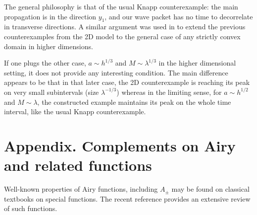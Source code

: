 \begin{rmq}
The general philosophy is that of the usual Knapp counterexample: the main propagation is in the direction $y_{1}$, and our wave packet has no time to decorrelate in transverse directions. A similar argument was used in \cite{doi2} to extend the previous counterexamples from the 2D model to the general case of any strictly convex domain in higher dimensions.
\end{rmq}
\begin{rmq}
If one plugs the other case, $a\sim h^{1/3}$ and $M\sim \lambda^{1/3}$ in the higher dimensional setting, it does not provide any interesting condition. The main difference appears to be that in that later case, the 2D counterexample is reaching its peak on very small subintervals (size $\lambda^{-1/3}$) whereas in the limiting sense, for $a\sim h^{1/2}$ and $M\sim \lambda$, the constructed example maintains its peak on the whole time interval, like the usual Knapp counterexample.
\end{rmq}

\appendix
{}
\section*{Appendix. Complements on Airy and related functions}
Well-known properties of Airy functions, including $A_{\pm}$ may be found on classical textbooks on special functions. The recent reference \cite{AFbook} provides an extensive review of such functions.
